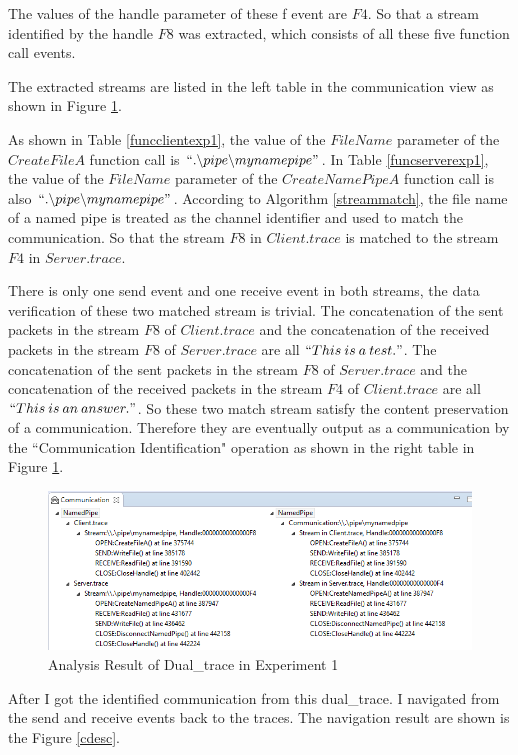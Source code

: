 The values of the handle parameter of these f event are $F4$. So that a stream identified by the handle $F8$ was extracted, which consists of all these five function call events. 

The extracted streams are listed in the left table in the communication view as shown in Figure \ref{result1}.

As shown in Table \ref{funcclientexp1}, the value of the $FileName$ parameter of the $CreateFileA$ function call is $``.\backslash pipe \backslash mynamepipe"$. In Table \ref{funcserverexp1}, the value of the $FileName$ parameter of the $CreateNamePipeA$ function call is also $``.\backslash pipe \backslash mynamepipe"$. According to Algorithm \ref{streammatch}, the file name of a named pipe is treated as the channel identifier and used to match the communication. So that the stream $F8$ in $Client.trace$ is matched to the stream $F4$ in $Server.trace$.

There is only one send event and one receive event in both streams, the data verification of these two matched stream is trivial. The concatenation of the sent packets in the stream $F8$ of $Client.trace$ and the concatenation of the received packets in the stream $F8$ of $Server.trace$ are all $``This\: is\: a\: test."$. The concatenation of the sent packets in the stream $F8$ of $Server.trace$ and the concatenation of the received packets in the stream $F4$ of $Client.trace$ are all $``This\: is\: an\: answer."$. So these two match stream satisfy the content preservation of a communication. Therefore they are eventually output as a communication by the ``Communication Identification" operation as shown in the right table in Figure \ref{result1}.


\begin{figure}[H]
\centerline{\includegraphics[scale=0.65]{Figures/result1}}
 \caption{Analysis Result of Dual\_trace in Experiment 1}
\label{result1}
\end{figure}

After I got the identified communication from this dual\_trace. I navigated from the send and receive events back to the traces. The navigation result are shown is the Figure \ref{cdesc}.

